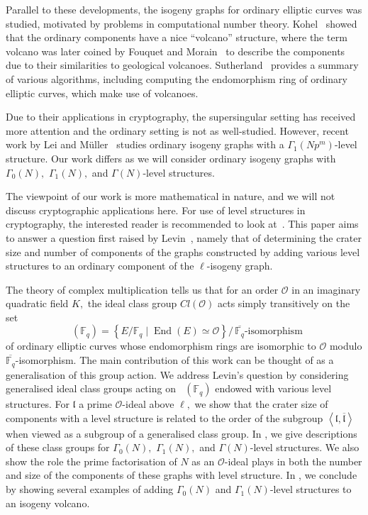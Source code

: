 \documentclass[11pt,a4paper]{amsart}
\theoremstyle{plain}
\theoremstyle{definition}
\theoremstyle{remark}
\DeclareMathOperator{\Endo}{End}
\DeclareMathOperator{\EllO}{Ell_{\mathcal{O}}}
\begin{document}
Parallel to these developments, the isogeny graphs for ordinary elliptic curves was studied, motivated by problems in computational number theory. Kohel~\cite{Kohel} showed that the ordinary components have a nice ``volcano'' structure, where the term volcano was later coined by Fouquet and Morain~\cite{Fouquet-Morain} to describe the components due to their similarities to geological volcanoes. Sutherland~\cite{Sutherland-volcanoes} provides a summary of various algorithms, including computing the endomorphism ring of ordinary elliptic curves, which make use of volcanoes.

Due to their applications in cryptography, the supersingular setting has received more attention and the ordinary setting is not as well-studied. However, recent work by Lei and M\"uller~\cite{Lei-Muller} studies ordinary isogeny graphs with a $\Gamma_1(Np^m)$-level structure. Our work differs as we will consider ordinary isogeny graphs with $\Gamma_0(N),$ $\Gamma_1(N),$ and $\Gamma(N)$-level structures.

The viewpoint of our work is more mathematical in nature, and we will not discuss cryptographic applications here. For use of level structures in cryptography, the interested reader is recommended to look at~\cite{CSIDH-w-LS, defeo-level-structure}. This paper aims to answer a question first raised by Levin~\cite{Shai}, namely that of determining the crater size and number of components of the graphs constructed by adding various level structures to an ordinary component of the $\ell$-isogeny graph.

The theory of complex multiplication tells us that for an order $\mathcal{O}$ in an imaginary quadratic field $K,$ the ideal class group $Cl(\mathcal{O})$ acts simply transitively on the set
\[
  \EllO(\mathbb{F}_{q}) = \left\{ E/\mathbb{F}_q \mid \Endo(E) \simeq \mathcal{O} \right\} /\,\overline{\mathbb{F}_q}\text{-isomorphism}
\]
of ordinary elliptic curves whose endomorphism rings are isomorphic to $\mathcal{O}$ modulo $\overline{\mathbb{F}_q}$-isomorphism. The main contribution of this work can be thought of as a generalisation of this group action. We address Levin's question by considering generalised ideal class groups acting on $\EllO(\mathbb{F}_q)$ endowed with various level structures. For $\mathfrak{l}$ a prime $\mathcal{O}$-ideal above $\ell,$ we show that the crater size of components with a level structure is related to the order of the subgroup $\left\langle \mathfrak{l}, \overline{\mathfrak{l}} \right\rangle$ when viewed as a subgroup of a generalised class group. In , we give descriptions of these class groups for $\Gamma_0(N),$ $\Gamma_1(N),$ and $\Gamma(N)$-level structures. We also show the role the prime factorisation of $N$ as an $\mathcal{O}$-ideal plays in both the number and size of the components of these graphs with level structure. In , we conclude by showing several examples of adding $\Gamma_0(N)$ and $\Gamma_1(N)$-level structures to an isogeny volcano.
\end{document}
